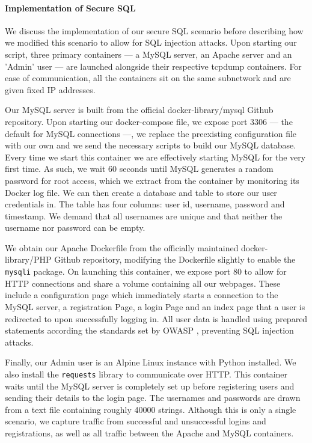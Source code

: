 \documentclass[msc,deptreport, cs]{infthesis} %
\begin{document}
\paragraph*{Implementation of Secure SQL}
We discuss the implementation of our secure SQL scenario before describing how we modified this scenario to allow for SQL injection attacks. Upon starting our script, three primary containers --- a MySQL server, an Apache server and an 'Admin' user --- are launched alongside their respective tcpdump containers. For ease of communication, all the containers sit on the same subnetwork and are given fixed IP addresses.

Our MySQL server is built from the official docker-library/mysql Github repository. Upon starting our docker-compose file, we expose port 3306 --- the default for MySQL connections ---, we replace the preexisting configuration file with our own and we send the necessary scripts to build our MySQL database. Every time we start this container we are effectively starting MySQL for the very first time. As such, we wait 60 seconds until MySQL generates a random password for root access, which we extract from the container by monitoring its Docker log file. We can then create a database and table to store our user credentials in. The table has four columns: user id, username, password and timestamp. We demand that all usernames are unique and that neither the username nor password can be empty. 

We obtain our Apache Dockerfile from the officially maintained docker-library/PHP Github repository, modifying the Dockerfile slightly to enable the \texttt{mysqli} package. On launching this container, we expose port 80 to allow for HTTP connections and share a volume containing all our webpages. These include a configuration page which immediately starts a connection to the MySQL server, a registration Page, a login Page and an index page that a user is redirected to upon successfully logging in. All user data is handled using prepared statements according the standards set by OWASP \cite{owasp}, preventing SQL injection attacks.

Finally, our Admin user is an Alpine Linux instance with Python installed. We also install the \texttt{requests} library to communicate over HTTP. This container waits until the MySQL server is completely set up before registering users and sending their details to the login page. The usernames and passwords are drawn from a text file containing roughly 40000 strings. Although this is only a single scenario, we capture traffic from successful and unsuccessful logins and registrations, as well as all traffic between the Apache and MySQL containers.
\end{document}
